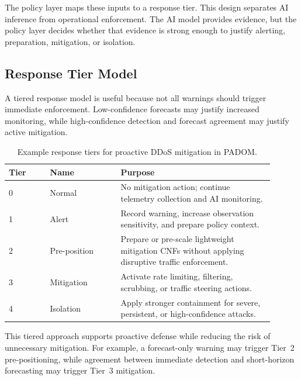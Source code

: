 \documentclass[12pt, a4paper, reqno, oneside]{book}
\newcommand{\padonap}{\textsc{PADOM}}
\begin{document}
The policy layer maps these inputs to a response tier. This design separates
AI inference from operational enforcement. The AI model provides evidence, but
the policy layer decides whether that evidence is strong enough to justify
alerting, preparation, mitigation, or isolation.

\subsection{Response Tier Model}
\label{subsec:response-tier-bg}

A tiered response model is useful because not all warnings should trigger
immediate enforcement. Low-confidence forecasts may justify increased
monitoring, while high-confidence detection and forecast agreement may justify
active mitigation.

\begin{table}[htbp]
\centering
\caption{Example response tiers for proactive DDoS mitigation in \padonap{}.}
\label{tab:response-tiers-bg}
\begin{tabular}{p{0.14\linewidth} p{0.24\linewidth} p{0.52\linewidth}}
\hline
\textbf{Tier} & \textbf{Name} & \textbf{Purpose} \\
\hline
0 & Normal &
No mitigation action; continue telemetry collection and AI monitoring. \\

1 & Alert &
Record warning, increase observation sensitivity, and prepare policy context. \\

2 & Pre-position &
Prepare or pre-scale lightweight mitigation CNFs without applying disruptive
traffic enforcement. \\

3 & Mitigation &
Activate rate limiting, filtering, scrubbing, or traffic steering actions. \\

4 & Isolation &
Apply stronger containment for severe, persistent, or high-confidence attacks. \\
\hline
\end{tabular}
\end{table}

This tiered approach supports proactive defense while reducing the risk of
unnecessary mitigation. For example, a forecast-only warning may trigger
Tier~2 pre-positioning, while agreement between immediate detection and
short-horizon forecasting may trigger Tier~3 mitigation.
\end{document}
